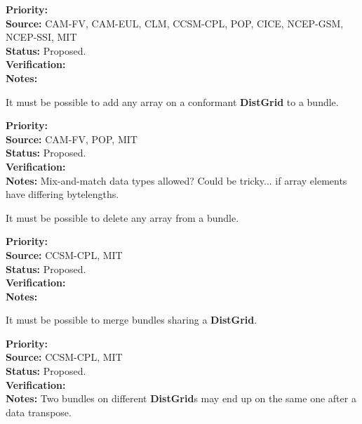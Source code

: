 \begin{reqlist}
{\bf Priority:} \\ 
{\bf Source:} CAM-FV, CAM-EUL, CLM, CCSM-CPL, POP, CICE, NCEP-GSM, NCEP-SSI, MIT \\
{\bf Status:} Proposed. \\
{\bf Verification:} \\
{\bf Notes:}
\end{reqlist}


It must be possible to add any array on a conformant \textbf{DistGrid}
to a bundle.

\begin{reqlist}
{\bf Priority:} \\ 
{\bf Source:} CAM-FV, POP, MIT \\
{\bf Status:} Proposed. \\
{\bf Verification:} \\
{\bf Notes:} Mix-and-match data types allowed? Could be tricky... if
  array elements have differing bytelengths.
\end{reqlist}


It must be possible to delete any array from a bundle.

\begin{reqlist}
{\bf Priority:} \\
{\bf Source:} CCSM-CPL, MIT \\
{\bf Status:} Proposed. \\
{\bf Verification:} \\
{\bf Notes:}
\end{reqlist}


It must be possible to merge bundles sharing a \textbf{DistGrid}.

\begin{reqlist}
{\bf Priority:} \\
{\bf Source:} CCSM-CPL, MIT \\
{\bf Status:} Proposed. \\
{\bf Verification:} \\
{\bf Notes:} Two bundles on different \textbf{DistGrid}s may end up on the same
  one after a data transpose.
\end{reqlist}



